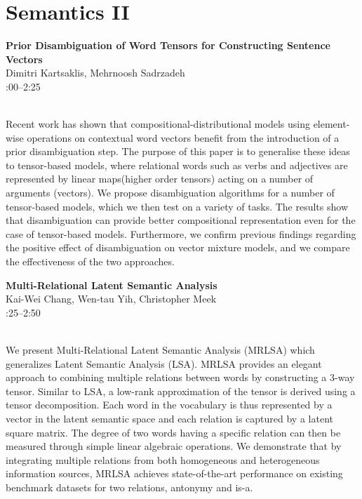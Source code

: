 \documentclass[twoside,makeidx]{book}
\renewcommand{\normalsize}{\fontsize{8}{9}\selectfont}
\renewcommand{\small}{\fontsize{7}{8}\selectfont}
\begin{document}
\section{Semantics II}
\vspace{-1em}
\par\vspace{2em}\noindent%
\begin{minipage}{\linewidth}%
\begin{center}
\textbf{\normalsize Prior Disambiguation of Word Tensors for Constructing Sentence Vectors}\\
\normalsize  Dimitri Kartsaklis,  Mehrnoosh Sadrzadeh\\
{\small 2:00--2:25}\\
\end{center}
\end{minipage}\\[0.5em]
\nopagebreak%
\noindent%
{\small Recent work has shown that compositional-distributional models using element-wise operations on contextual word vectors benefit from the introduction of a prior disambiguation step. The purpose of this paper is to generalise these ideas to tensor-based models, where relational words such as verbs and adjectives are represented by linear maps(higher order tensors) acting on a number of arguments (vectors). We propose disambiguation algorithms for a number of tensor-based models, which we then test on a variety of tasks. The results show that disambiguation can provide better compositional representation even for the case of tensor-based models. Furthermore, we confirm previous findings regarding the positive effect of disambiguation on vector mixture models, and we compare the effectiveness of the two approaches.}
\par\vspace{2em}\noindent%
\begin{minipage}{\linewidth}%
\begin{center}
\textbf{\normalsize Multi-Relational Latent Semantic Analysis}\\
\normalsize  Kai-Wei Chang,  Wen-tau Yih,  Christopher Meek\\
{\small 2:25--2:50}\\
\end{center}
\end{minipage}\\[0.5em]
\nopagebreak%
\noindent%
{\small We present Multi-Relational Latent Semantic Analysis (MRLSA) which generalizes Latent Semantic Analysis (LSA). MRLSA provides an elegant approach to combining multiple relations between words by constructing a 3-way tensor.  Similar to LSA, a low-rank approximation of the tensor is derived using a tensor decomposition. Each word in the vocabulary is thus represented by a vector in the latent semantic space and each relation is captured by a latent square matrix. The degree of two words having a specific relation can then be measured through simple linear algebraic operations.  We demonstrate that by integrating multiple relations from both homogeneous and heterogeneous information sources, MRLSA achieves state-of-the-art performance on existing benchmark datasets for two relations, antonymy and is-a.}
\end{document}
